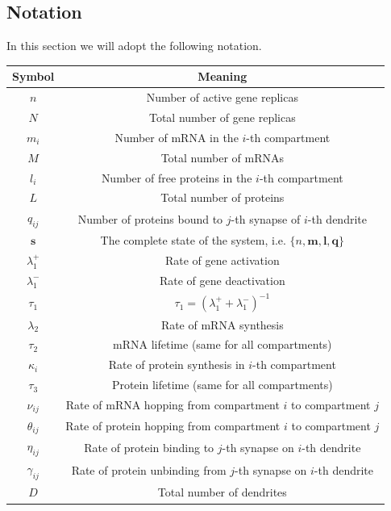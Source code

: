 \documentclass[a4paper, 11pt]{article}
\begin{document}
\subsection{Notation}
In this section we will adopt the following notation.
\begin{center}
  \begin{tabular}{|c|c|}
    \hline
        {\bf Symbol}         &{\bf Meaning}\\ \hline
        $n$                 &Number of active gene replicas \\ \hline
        $N$                 &Total number of gene replicas \\ \hline
        $m_i$               &Number of mRNA in the $i$-th compartment \\ \hline
        $M$                 &Total number of mRNAs\\ \hline
        $l_i$               &Number of free proteins in the $i$-th compartment\\ \hline
        $L$                 &Total number of proteins\\ \hline
        $q_{ij}$            &Number of proteins bound to $j$-th synapse of $i$-th dendrite\\ \hline
        $\mathbf s$        &The complete state of the system, i.e. $\{n, \mathbf m,\mathbf l, \mathbf q\}$\\ \hline
        $\lambda_1^+$        &Rate of gene activation\\ \hline
        $\lambda_1^-$        &Rate of gene deactivation\\ \hline
        $\tau_1$           &$\tau_1 = (\lambda_1^+ + \lambda_1^-)^{-1}$\\ \hline
        $\lambda_2$        &Rate of mRNA synthesis\\ \hline
        $\tau_2$           &mRNA lifetime (same for all compartments)\\ \hline
        $\kappa_i$          &Rate of protein synthesis in $i$-th compartment\\ \hline
        $\tau_3$          &Protein lifetime (same for all compartments)\\ \hline
        $\nu_{ij}$         &Rate of mRNA hopping from compartment $i$ to compartment $j$ \\ \hline
        $\theta_{ij}$      &Rate of protein hopping from compartment $i$ to compartment $j$ \\ \hline
        $\eta_{ij}$        &Rate of protein binding to $j$-th synapse on $i$-th dendrite \\ \hline
        $\gamma_{ij}$        &Rate of protein unbinding from $j$-th synapse on $i$-th dendrite \\ \hline
        $D$                 &Total number of dendrites \\ \hline
  \end{tabular}
\end{center}
\end{document}
